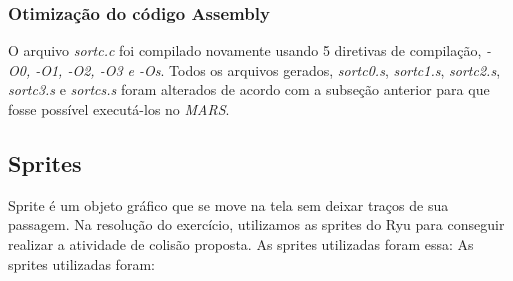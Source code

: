 \documentclass[12pt]{article}
\begin{document}
\subsubsection{Otimização do código Assembly}
\label{subsubsec:ot}

O arquivo \textit{sortc.c} foi compilado novamente usando 5 diretivas de compilação, \textit{-O0, -O1, -O2, -O3 e -Os}. Todos os arquivos gerados, \textit{sortc0.s}, \textit{sortc1.s}, \textit{sortc2.s}, \textit{sortc3.s} e \textit{sortcs.s} foram alterados de acordo com a subseção anterior para que fosse possível executá-los no \textit{MARS}.

\subsection{Sprites}
\label{subsec:sprites}
	Sprite é um objeto gráfico que se move na tela sem deixar traços de sua passagem. Na resolução do exercício, utilizamos as sprites do Ryu para conseguir realizar a atividade de colisão proposta.
	As sprites utilizadas foram essa: 
	As sprites utilizadas foram:
	
\end{document}
